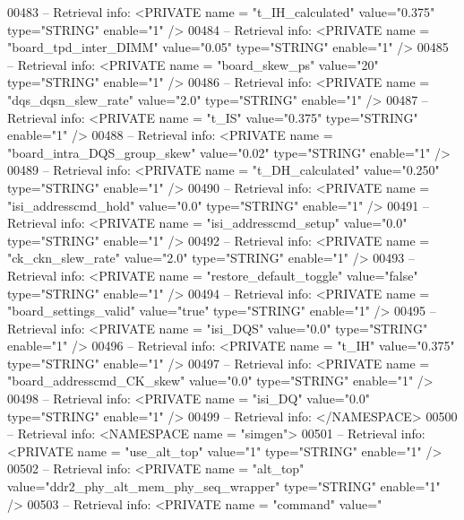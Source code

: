 \begin{DoxyCode}
{00483 \textcolor{keyword}{-- Retrieval info:      <PRIVATE name = "t\_IH\_calculated" value="0.375"  type="STRING"  enable="1" />}
00484 \textcolor{keyword}{-- Retrieval info:      <PRIVATE name = "board\_tpd\_inter\_DIMM" value="0.05"  type="STRING"  enable="1" />}
00485 \textcolor{keyword}{-- Retrieval info:      <PRIVATE name = "board\_skew\_ps" value="20"  type="STRING"  enable="1" />}
00486 \textcolor{keyword}{-- Retrieval info:      <PRIVATE name = "dqs\_dqsn\_slew\_rate" value="2.0"  type="STRING"  enable="1" />}
00487 \textcolor{keyword}{-- Retrieval info:      <PRIVATE name = "t\_IS" value="0.375"  type="STRING"  enable="1" />}
00488 \textcolor{keyword}{-- Retrieval info:      <PRIVATE name = "board\_intra\_DQS\_group\_skew" value="0.02"  type="STRING" 
       enable="1" />}
00489 \textcolor{keyword}{-- Retrieval info:      <PRIVATE name = "t\_DH\_calculated" value="0.250"  type="STRING"  enable="1" />}
00490 \textcolor{keyword}{-- Retrieval info:      <PRIVATE name = "isi\_addresscmd\_hold" value="0.0"  type="STRING"  enable="1" />}
00491 \textcolor{keyword}{-- Retrieval info:      <PRIVATE name = "isi\_addresscmd\_setup" value="0.0"  type="STRING"  enable="1" />}
00492 \textcolor{keyword}{-- Retrieval info:      <PRIVATE name = "ck\_ckn\_slew\_rate" value="2.0"  type="STRING"  enable="1" />}
00493 \textcolor{keyword}{-- Retrieval info:      <PRIVATE name = "restore\_default\_toggle" value="false"  type="STRING"  enable="1"
       />}
00494 \textcolor{keyword}{-- Retrieval info:      <PRIVATE name = "board\_settings\_valid" value="true"  type="STRING"  enable="1" />}
00495 \textcolor{keyword}{-- Retrieval info:      <PRIVATE name = "isi\_DQS" value="0.0"  type="STRING"  enable="1" />}
00496 \textcolor{keyword}{-- Retrieval info:      <PRIVATE name = "t\_IH" value="0.375"  type="STRING"  enable="1" />}
00497 \textcolor{keyword}{-- Retrieval info:      <PRIVATE name = "board\_addresscmd\_CK\_skew" value="0.0"  type="STRING"  enable="1"
       />}
00498 \textcolor{keyword}{-- Retrieval info:      <PRIVATE name = "isi\_DQ" value="0.0"  type="STRING"  enable="1" />}
00499 \textcolor{keyword}{-- Retrieval info:     </NAMESPACE>}
00500 \textcolor{keyword}{-- Retrieval info:     <NAMESPACE name = "simgen">}
00501 \textcolor{keyword}{-- Retrieval info:      <PRIVATE name = "use\_alt\_top" value="1"  type="STRING"  enable="1" />}
00502 \textcolor{keyword}{-- Retrieval info:      <PRIVATE name = "alt\_top" value="ddr2\_phy\_alt\_mem\_phy\_seq\_wrapper"  type="STRING" 
       enable="1" />}
00503 \textcolor{keyword}{-- Retrieval info:      <PRIVATE name = "command" value="
}}
\end{DoxyCode}
